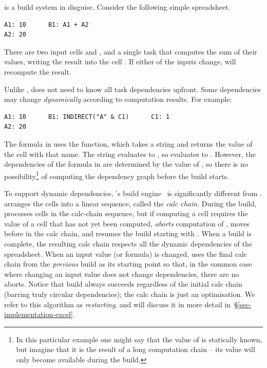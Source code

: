 \Excel is a build system in disguise. Consider the following simple spreadsheet.

\vspace{1mm}
\begin{verbatim}
A1: 10      B1: A1 + A2
A2: 20
\end{verbatim}
\vspace{1mm}

\noindent
There are two input cells  and , and a single task that computes
the sum of their values, writing the result into the cell . If either of
the inputs change, \Excel will recompute the result.

Unlike \Make, \Excel does not need to know all task dependencies upfront. Some
dependencies may change \emph{dynamically} according to computation results. For
example:

\vspace{1mm}
\begin{verbatim}
A1: 10      B1: INDIRECT("A" & C1)      C1: 1
A2: 20
\end{verbatim}
\vspace{1mm}

\noindent
The formula in  uses the  function, which takes a string
and returns the value of the cell with that name.  The string evaluates to
, so  evaluates to . However, the dependencies of the
formula in  are determined by the value of , so there is no
possibility\footnote{In this particular example one might say that the value of
 is statically known, but imagine that it is the result of a long
computation chain -- its value will only become available during the build.}
of computing the dependency graph before the build starts.

To support dynamic dependencies, \Excel's build engine~\cite{excel_recalc} is
significantly different from \Make. \Excel arranges the cells into a linear
sequence, called the \emph{calc chain}.  During the build, \Excel processes
cells in the calc-chain sequence, but if computing a cell  requires the
value of a cell  that has not yet been computed, \Excel \emph{aborts}
computation of , moves  before  in the calc chain, and
resumes the build starting with . When a build is complete, the resulting
calc chain respects all the dynamic dependencies of the spreadsheet. When an
input value (or formula) is changed, \Excel uses the final calc chain from the
\emph{previous} build as its starting point so that, in the common case where
changing an input value does not change dependencies, there are no aborts.
Notice that build always succeeds regardless of the initial calc chain (barring
truly circular dependencies); the calc chain is just an optimisation.
We refer to this algorithm as \emph{restarting}, and will discuss it
in more detail in~\S\ref{sec-implementation-excel}.

